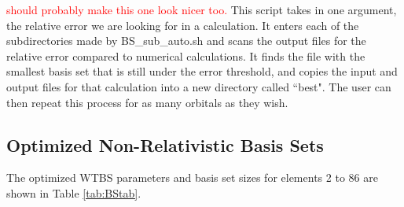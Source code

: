 \documentclass[12pt]{report}
\newcommand{\notetodylan}[1]{\textcolor{red}{#1}} %
\begin{document}


\notetodylan{should probably make this one look nicer too.} This script takes in one argument, the relative error we are looking for in a calculation. It enters each of the subdirectories made by BS\_sub\_auto.sh and scans the output files for the relative error compared to numerical calculations. It finds the file with the smallest basis set that is still under the error threshold, and copies the input and output files for that calculation into a new directory called ``best". The user can then repeat this process for as many orbitals as they wish.

\subsection{Optimized Non-Relativistic Basis Sets}
The optimized WTBS parameters and basis set sizes for elements 2 to 86 are shown in Table \ref{tab:BStab}.
\end{document}
